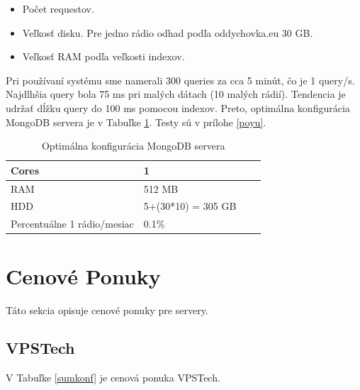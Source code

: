\documentclass[11pt]{article}
\begin{document}
\begin{itemize}[noitemsep]
\item Počet requestov.
\item Veľkosť disku. Pre jedno rádio odhad podľa oddychovka.eu 30 GB.
\item Veľkosť RAM podľa veľkosti indexov. 
\end{itemize}   

Pri používaní systému sme namerali 300 queries za cca 5 minút, čo je 1 query/s. Najdlhšia query bola 75 ms pri malých dátach (10 malých rádií). Tendencia je udržať dĺžku query do 100 ms pomocou indexov. Preto, optimálna konfigurácia MongoDB servera je v Tabuľke \ref{konf4}. Testy sú v prílohe \ref{poyu}.


\begin{table}[htp]
\centering
\begin{tabular}{|l|l|l|l|}
\hline
	Cores & 1 \\
\hline
	RAM & 512 MB \\
\hline
	HDD & 5+(30*10) = 305 GB \\
\hline
	Percentuálne 1 rádio/mesiac & 0.1\% \\
\hline
\end{tabular}
\caption{Optimálna konfigurácia MongoDB servera}
\label{konf4}
\end{table}

\section{Cenové Ponuky}

Táto sekcia opisuje cenové ponuky pre servery.

\subsection{VPSTech}

V Tabuľke \ref{sumkonf} je cenová ponuka VPSTech.
\end{document}
